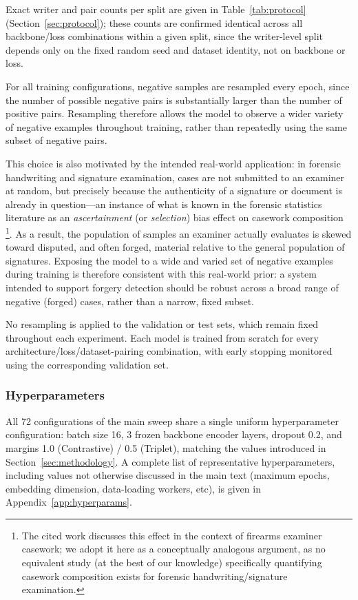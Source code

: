 Exact writer and pair counts per split are given in
Table~\ref{tab:protocol} (Section~\ref{sec:protocol}); these counts are
confirmed identical across all backbone/loss combinations within a
given split, since the writer-level split depends only on the fixed
random seed and dataset identity, not on backbone or loss.

For all training configurations, negative samples are resampled every epoch, since the number of possible negative pairs is substantially larger than the number of positive pairs. Resampling therefore allows the model to observe a wider variety of negative examples throughout training, rather than repeatedly using the same subset of negative pairs.

This choice is also motivated by the intended real-world application: in forensic handwriting and signature examination, cases are not submitted to an examiner at random, but precisely because the authenticity of a signature or document is already in question---an instance of what is known in the forensic statistics literature as an \emph{ascertainment} (or \emph{selection}) bias effect on casework composition \cite{rosenblum2024incorrect}\footnote{The cited work discusses this effect in the context of firearms examiner casework; we adopt it here as a conceptually analogous argument, as no equivalent study (at the best of our knowledge) specifically quantifying casework composition exists for forensic handwriting/signature examination.}. As a result, the population of samples an examiner actually evaluates is skewed toward disputed, and often forged, material relative to the general population of signatures. Exposing the model to a wide and varied set of negative examples during training is therefore consistent with this real-world prior: a system intended to support forgery detection should be robust across a broad range of negative (forged) cases, rather than a narrow, fixed subset.

No resampling is applied to the validation or test sets, which remain fixed throughout each experiment. Each model is trained from scratch for every architecture/loss/dataset-pairing combination, with early stopping monitored using the corresponding validation set.

\subsubsection{Hyperparameters}

All 72 configurations of the main sweep share a single uniform
hyperparameter configuration: batch size 16, 3 frozen backbone encoder
layers, dropout 0.2, and margins 1.0 (Contrastive) / 0.5 (Triplet), matching
the values introduced in Section~\ref{sec:methodology}.
A complete list of representative hyperparameters, including values not
otherwise discussed in the main text (maximum epochs, embedding
dimension, data-loading workers, etc), is given in
Appendix~\ref{app:hyperparams}.